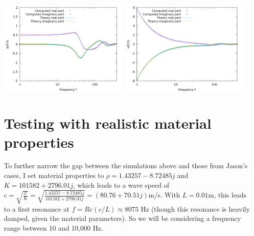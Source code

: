 \documentclass{article}
\begin{document}
\begin{center}
\includegraphics[width=0.48\textwidth]{wave-guide-tet/with-attenuation/pressure-at-center.png}
\includegraphics[width=0.48\textwidth]{wave-guide-tet/with-attenuation/velocity-at-center.png}
\end{center}


\section{Testing with realistic material properties}

To further narrow the gap between the simulations above and those from
Jason's cases, I set material properties to $\rho=1.43257-8.72485j$
and $K=101582+2796.01j$, which leads to a wave speed of
$c=\sqrt{\frac{\rho}{K}}=\sqrt{\frac{1.43257-8.72485j}{101582+2796.01j}}=(80.76+70.51j)$m/s. With
$L=0.01$m, this leads to a first resonance at $f=Re(c/L)\approx 8075$
Hz (though this resonance is heavily damped, given the material
parameters). So we will be considering a frequency range between 10
and 10,000 Hz.
\end{document}
